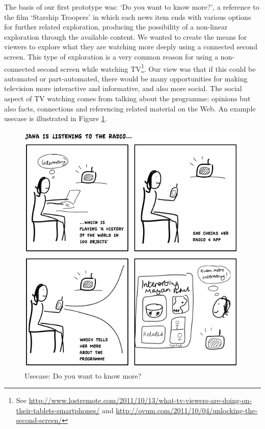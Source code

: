 \documentclass{notube}
\begin{document}
The basis of our first prototype was: `Do you want to know more?', a reference to the film `Starship Troopers' in which each news item ends with various options for further related exploration, producing the possibility of a non-linear exploration through the available content. We wanted to create the means for viewers to explore what they are watching more deeply using a connected second screen. This type of exploration is a very common reason for using a non-connected second screen while watching TV\footnote{See \url{http://www.lostremote.com/2011/10/13/what-tv-viewers-are-doing-on-their-tablets-smartphones/} and  \url{http://ovum.com/2011/10/04/unlocking-the-second-screen/}}. Our view was that if this could be automated or part-automated, there would be many opportunities for making television more interactive and informative, and also more social. The social aspect of TV watching comes from talking about the programme: opinions but also facts, connections and referencing related material on the Web. An example usecase is illustrated in Figure \ref{fig:more}. 

\begin{figure}[htbp]
\begin{center}
\includegraphics[width=6in]{images/more.png}
\caption{Usecase: Do you want to know more?} \label{fig:more}
\end{center}
\end{figure} 
\end{document}
